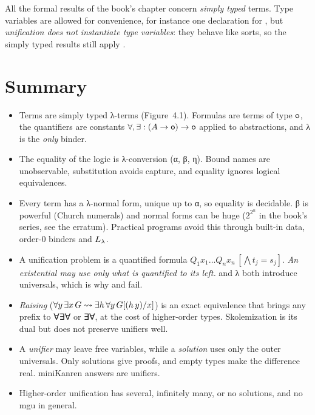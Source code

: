 {\begin{remark}[Polymorphism]
All the formal results of the book's chapter concern \emph{simply typed} terms. Type variables are
allowed for convenience, for instance one declaration for , but \emph{unification does not
instantiate type variables}: they behave like sorts, so the simply typed results still apply
.
\end{remark}

\section{Summary}\label{sec:lambda-summary}

\begin{itemize}
\item Terms are simply typed λ-terms (Figure~4.1). Formulas are terms of type $\mathsf{o}$, the quantifiers
      are constants $\forall,\exists:(A\to\mathsf{o})\to\mathsf{o}$ applied to abstractions, and λ is the
      \emph{only} binder.
\item The equality of the logic is λ-conversion (α, β, η). Bound names are unobservable, substitution
      avoids capture, and equality ignores logical equivalences.
\item Every term has a λ-normal form, unique up to α, so equality is decidable. β is powerful (Church
      numerals) and normal forms can be huge ($2^{2^n}$ in the book's series, see the erratum).
      Practical programs avoid this through built-in data, order-0 binders and $L_\lambda$.
\item A unification problem is a quantified formula $Q_1x_1\dots Q_nx_n\,[\bigwedge t_j=s_j]$.
      \emph{An existential may use only what is quantified to its left.}  and λ both introduce
      universals, which is why  and  fail.
\item \emph{Raising} ($\forall y\,\exists x\,G\rightsquigarrow\exists h\,\forall y\,G[(h\,y)/x]$) is an
      exact equivalence that brings any prefix to ∀∃∀ or ∃∀, at the cost of higher-order types.
      Skolemization is its dual but does not preserve unifiers well.
\item A \emph{unifier} may leave free variables, while a \emph{solution} uses only the outer universals.
      Only solutions give proofs, and empty types make the difference real. miniKanren answers are
      unifiers.
\item Higher-order unification has several, infinitely many, or no solutions, and no mgu in general.

\end{itemize}}
